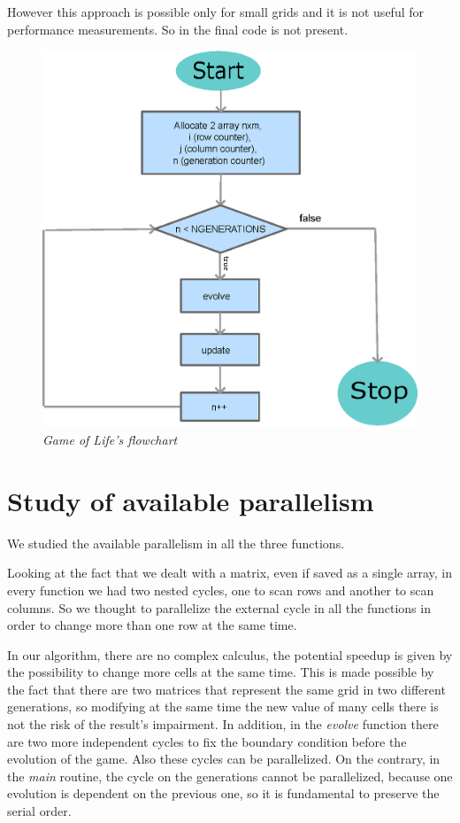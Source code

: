 \documentclass[a4paper,11pt,twoside]{report}
\begin{document}
\noindent However this approach is possible only for small grids and it is not useful for performance measurements. So in the final code is not present.
\begin{figure}
	\centering
	\includegraphics[scale = 0.8]{chart.eps}
	\caption{\emph{Game of Life's flowchart}}\label{fig:1}
\end{figure}

\chapter{Study of available parallelism}

\noindent We studied the available parallelism in all the three functions. 

\noindent Looking at the fact that we dealt with a matrix, even if saved as a single array, in every function we had two nested cycles, one to scan rows and another to scan columns. So we thought to parallelize the external cycle in all the functions in order to change more than one row at the same time.

\noindent In our algorithm, there are no complex calculus, the potential speedup is given by the possibility to change more cells at the same time. This is made possible by the fact that there are two matrices that represent the same grid in two different generations, so modifying at the same time the new value of many cells there is not the risk of the result's impairment.
In addition, in the \emph{evolve} function there are two more independent cycles to fix the boundary condition before the evolution of the game. Also these cycles can be parallelized. 
On the contrary, in the \emph{main} routine, the cycle on the generations cannot be parallelized, because one evolution is dependent on the previous one, so it is fundamental to preserve the serial order. 
\end{document}
